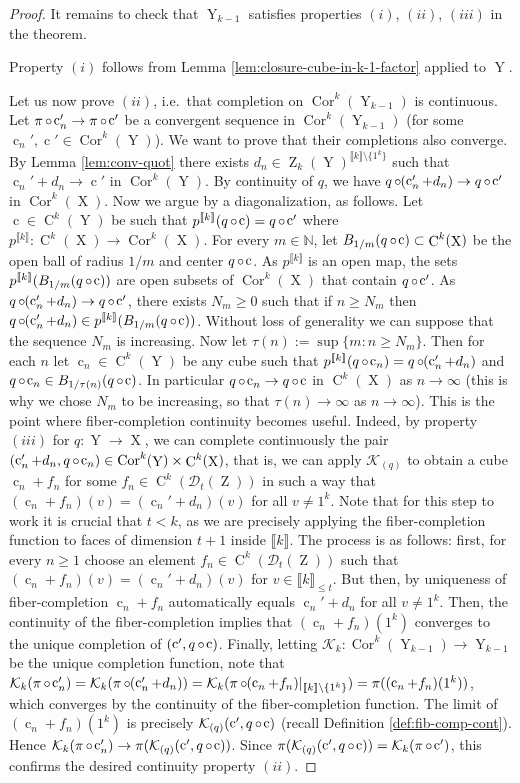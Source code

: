 \documentclass[a4paper,12pt,reqno]{amsart}
\theoremstyle{definition}
\def\to{\rightarrow}
\newcommand*{\db}[1]{\llbracket #1\rrbracket}
\newcommand{\mc}{\mathcal}
\newcommand{\mb}{\mathbb}
\DeclareMathOperator{\ab}{Z}
\DeclareMathOperator{\q}{c}
\DeclareMathOperator{\ns}{X}
\DeclareMathOperator{\nss}{Y}
\DeclareMathOperator{\co}{\circ\hspace{-0.02 cm}}
\DeclareMathOperator{\cu}{C}
\DeclareMathOperator{\cor}{Cor}
\begin{document}
\begin{proof}
It remains to check that $\nss_{k-1}$ satisfies properties $(i)$, $(ii)$, $(iii)$ in the theorem.

Property $(i)$ follows from Lemma \ref{lem:closure-cube-in-k-1-factor} applied to $\nss$.

Let us now prove $(ii)$, i.e.\ that completion on $\cor^k(\nss_{k-1})$ is continuous. Let $\pi\co \q_n'\to \pi\co \q'$ be a convergent sequence in $\cor^k(\nss_{k-1})$ (for some $\q_n',\q'\in \cor^k(\nss)$). We want to prove that their completions also converge. By Lemma \ref{lem:conv-quot} there exists $d_n\in \ab_k(\nss)^{\db{k}\setminus\{1^k\}}$ such that $\q_n'+d_n\to \q'$ in $\cor^k(\nss)$. By continuity of $q$, we have $q\co (\q_n'+d_n)\to q\co \q'$ in $\cor^k(\ns)$. Now we argue by a diagonalization, as follows. Let $\q\in \cu^k(\nss)$ be such that $p^{\db{k}}(q\co \q)=q\co \q'$ where $p^{\db{k}}:\cu^k(\ns)\to \cor^k(\ns)$. For every $m\in \mb{N}$, let $B_{1/m}(q\co \q)\subset \cu^k(\ns)$ be the open ball of radius $1/m$ and center $q\co \q$. As $p^{\db{k}}$ is an open map, the sets $p^{\db{k}}(B_{1/m}(q\co \q))$ are open subsets of $\cor^k(\ns)$ that contain $q\co \q'$. As $q\co (\q_n'+d_n)\to q\co \q'$, there exists $N_m\ge 0$ such that if $n\ge N_m$ then $q\co (\q_n'+d_n)\in p^{\db{k}}(B_{1/m}(q\co \q))$. Without loss of generality we can suppose that the sequence $N_m$ is increasing. Now let $\tau(n):=\sup\{m:n\ge N_m\}$. Then for each $n$ let $\q_n\in \cu^k(\nss)$ be any cube such that $p^{\db{k}}(q\co \q_n)=q\co(\q_n'+d_n)$ and $q\co \q_n\in B_{1/\tau(n)}(q\co\q)$. In particular $q\co \q_n\to q\co \q$ in $\cu^k(\ns)$ as $n\to\infty$ (this is why we chose $N_m$ to be increasing, so that $\tau(n)\to\infty$ as $n\to\infty$). This is the point where fiber-completion continuity becomes useful. Indeed, by property $(iii)$ for $q:\nss\to \ns$, we can complete continuously the pair $(\q_n'+d_n,q\co\q_n)\in \cor^k(\nss)\times \cu^k(\ns)$, that is, we can apply $\mc{K}_{(q)}$ to obtain a cube $\q_n+f_n$ for some $f_n\in \cu^k(\mc{D}_t(\ab))$ in such a way that $(\q_n+f_n)(v)=(\q_n'+d_n)(v)$ for all $v\not=1^k$. Note that for this step to work it is crucial that $t<k$, as we are precisely applying the fiber-completion function to faces of dimension $t+1$ inside $\db{k}$. The process is as follows: first, for every $n\ge 1$ choose an element $f_n\in\cu^k(\mc{D}_t(\ab))$ such that $(\q_n+f_n)(v) =(\q_n'+d_n)(v)$ for $v\in \db{k}_{\le t}$. But then, by uniqueness of fiber-completion $\q_n+f_n$ automatically equals $\q_n'+d_n$ for all $v\not=1^k$. Then, the continuity of the fiber-completion implies that $(\q_n+f_n)(1^k)$ converges to the unique completion of $(\q',q\co\q)$. Finally, letting $\mc{K}_k:\cor^k(\nss_{k-1})\to \nss_{k-1}$ be the unique completion function, note that $\mc{K}_k(\pi\co \q_n')=\mc{K}_k(\pi\co (\q_n'+d_n))=\mc{K}_k(\pi\co (\q_n+f_n)|_{\db{k}\setminus\{1^k\}}) = \pi((\q_n+f_n)(1^k))$, which converges by the continuity of the fiber-completion function. The limit of $(\q_n+f_n)(1^k)$ is precisely $\mc{K}_{(q)}(\q',q\co\q)$ (recall Definition \ref{def:fib-comp-cont}). Hence $\mc{K}_k(\pi\co\q_n')\to \pi(\mc{K}_{(q)}(\q',q\co\q))$. Since $\pi(\mc{K}_{(q)}(\q',q\co\q)) = \mc{K}_k(\pi\co\q')$, this confirms the desired continuity property $(ii)$.


\end{proof}
\end{document}
